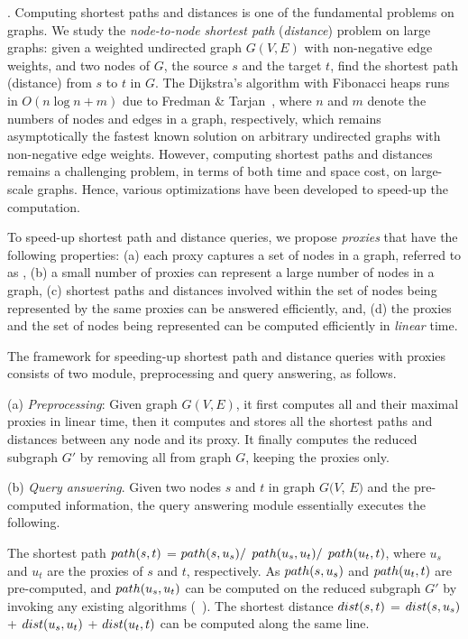 . Computing shortest paths and distances is one of the fundamental problems on graphs. We study the {\em node-to-node shortest path} ({\em distance}) problem on large graphs: given a weighted undirected graph $G(V, E)$ with non-negative edge weights, and two nodes of $G$, the source $s$ and the target $t$, find the shortest path (distance) from $s$ to $t$ in $G$. The Dijkstra's algorithm with Fibonacci heaps runs in $O(n\log n + m)$ due to Fredman \& Tarjan~\cite{CormenLRS01}, where $n$ and $m$ denote the numbers of nodes and edges in a graph, respectively, which remains asymptotically the fastest known solution on arbitrary undirected graphs with non-negative edge weights.
However, computing shortest  paths and distances remains a challenging problem, in terms of both time and space cost, on large-scale graphs. Hence, various optimizations have been developed to speed-up the computation.

To speed-up shortest  path and distance queries, we propose {\em proxies} that have the following properties:
%
(a) each proxy captures a set of nodes in a graph, referred to as \dra,
%
(b) a small number of proxies can represent a large number of nodes in a graph,
%
(c) shortest paths and distances involved within the set of nodes being represented by the same proxies can be answered efficiently, and,
%
(d) the proxies and the set of nodes being represented can be computed efficiently in {\em linear} time.



The framework for speeding-up shortest path and distance queries with proxies consists of two module, preprocessing and query answering, as follows.


\ni(a) {\em Preprocessing}: Given graph $G(V, E)$, it first computes all \dras and their maximal proxies in linear time, then it computes and stores all the shortest paths and distances between any node and its proxy. It finally computes the reduced subgraph $G'$ by removing all \dras from graph $G$, \ie keeping the proxies only.


\ni(b) {\em Query answering}. Given two nodes $s$ and $t$ in graph $G(V$, $E)$  and the pre-computed information, the query answering module essentially executes the following.

The shortest path $\path(s, t)$ = $\path(s, u_s)/$ $\path(u_s, u_t)/$ $\path(u_t, t)$, where $u_s$ and $u_t$ are the proxies of $s$ and $t$, respectively.
As  $\path(s, u_s)$ and $\path(u_t, t)$ are pre-computed, and $\path(u_s, u_t)$ can be computed on the reduced subgraph $G'$ by invoking any existing algorithms
(\eg \ah~\cite{zhu2013shortest}).
%
The shortest distance $\dist(s, t)$ = $\dist(s, u_s)$ + $\dist(u_s, u_t)$ + $\dist(u_t, t)$ can be computed along the same line.

